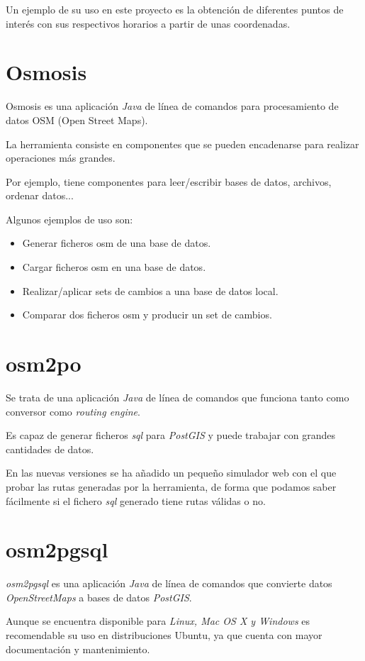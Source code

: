 Un ejemplo de su uso en este proyecto es la obtención de diferentes puntos de interés con sus respectivos horarios a partir de unas coordenadas.

\section{Osmosis}
Osmosis es una aplicación \textit{Java} de línea de comandos para procesamiento de datos OSM (Open Street Maps).

La herramienta consiste en componentes que se pueden encadenarse para realizar operaciones más grandes.

Por ejemplo, tiene componentes para leer/escribir bases de datos, archivos, ordenar datos...

Algunos ejemplos de uso son:
\begin{itemize}
\tightlist
\item Generar ficheros osm de una base de datos.
\item Cargar ficheros osm en una base de datos.
\item Realizar/aplicar sets de cambios a una base de datos local.
\item Comparar dos ficheros osm y producir un set de cambios.
\end{itemize}
\section{osm2po}
Se trata de una aplicación \textit{Java} de línea de comandos que funciona tanto como conversor como \textit{routing engine}\cite{wiki:osm2po}.

Es capaz de generar ficheros \textit{sql} para \textit{PostGIS} y puede trabajar con grandes cantidades de datos.

En las nuevas versiones se ha añadido un pequeño simulador web con el que probar las rutas generadas por la herramienta, de forma que podamos saber fácilmente si el fichero \textit{sql} generado tiene rutas válidas o no.
\section{osm2pgsql}
\textit{osm2pgsql}\cite{wiki:osm2pgsql} es una aplicación \textit{Java} de línea de comandos que convierte datos \textit{OpenStreetMaps} a bases de datos \textit{PostGIS}.

Aunque se encuentra disponible para \textit{Linux, Mac OS X y Windows} es recomendable su uso en distribuciones Ubuntu, ya que cuenta con mayor documentación y mantenimiento.

